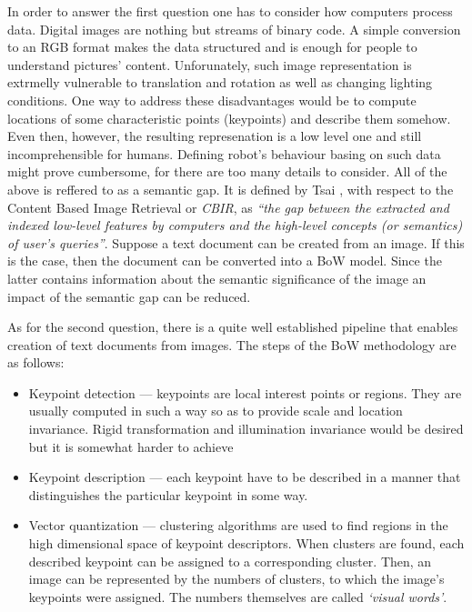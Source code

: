 \documentclass[a4paper,12pt]{article}
\begin{document}
  In order to answer the first question one has to consider how computers process data. Digital images are nothing but streams of binary code. A simple conversion to an RGB format makes the data structured and is enough for people to understand pictures' content. Unforunately, such image representation is extrmelly vulnerable to translation and rotation as well as changing lighting conditions. One way to address these disadvantages would be to compute locations of some characteristic points (keypoints) and describe them somehow. Even then, however, the resulting represenation is a low level one and still incomprehensible for humans. Defining robot's behaviour basing on such data might prove cumbersome, for there are too many details to consider. All of the above is reffered to as a semantic gap. It is defined by Tsai \cite{tsai2012bag}, with respect to the Content Based Image Retrieval or \textit{CBIR}, as \emph{``the gap between the extracted and indexed low-level features by computers and the high-level concepts (or semantics) of user’s queries''}. Suppose a text document can be created from an image. If this is the case, then the document can be converted into a BoW model. Since the latter contains information about the semantic significance of the image an impact of the semantic gap can be reduced.
  
  As for the second question, there is a quite well established pipeline that enables creation of text documents from images. The steps of the BoW methodology are as follows:
  \begin{itemize}
   \item Keypoint detection --- keypoints are local interest points or regions. They are usually computed in such a way so as to provide scale and location invariance. Rigid transformation and illumination invariance would be desired but it is somewhat harder to achieve
   \item Keypoint description --- each keypoint have to be described in a manner that distinguishes the particular keypoint in some way.
   \item Vector quantization --- clustering algorithms are used to find regions in the high dimensional space of keypoint descriptors. When clusters are found, each described keypoint can be assigned to a corresponding cluster. Then, an image can be represented by the numbers of clusters, to which the image's keypoints were assigned. The numbers themselves are called \emph{`visual words'}.
  \end{itemize}
  
\end{document}
